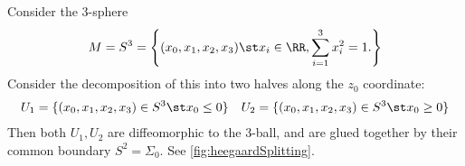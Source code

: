 

    Consider the 3-sphere
    \[M=S^3=\left\{(x_0, x_1, x_2, x_3)\st x_i\in \RR, \sum_{i=1}^3 x_i^2=1.\right\}\]
    Consider the decomposition of this into two halves along the $z_0$ coordinate:
    \begin{align*}
        U_1=\{(x_0, x_1, x_2, x_3)\in S^3 \st x_0\leq 0\}&& U_2=\{(x_0, x_1, x_2, x_3)\in S^3 \st x_0\geq 0\}
    \end{align*}
    Then both $U_1, U_2$ are diffeomorphic to the 3-ball, and are glued together by their common boundary $S^2=\Sigma_0$. See \cref{fig:heegaardSplitting}.
    
    \label{exm:heegaardSplitting}
